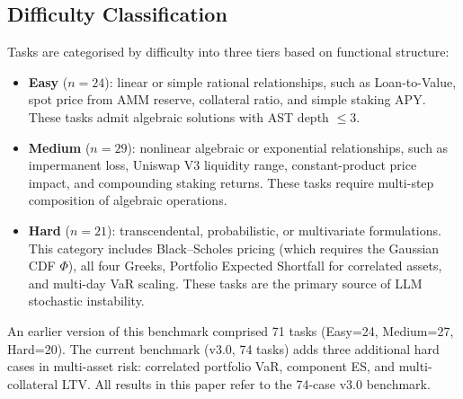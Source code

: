 
\subsection{Difficulty Classification}\label{subsec:difficulty-classification}
\label{sec:bench_difficulty}

Tasks are categorised by difficulty into three tiers based on functional structure:

\begin{itemize}
  \item \textbf{Easy} ($n=24$): linear or simple rational relationships, such as
    Loan-to-Value, spot price from AMM reserve, collateral ratio, and simple staking APY.
    These tasks admit algebraic solutions with AST depth $\le 3$.

  \item \textbf{Medium} ($n=29$): nonlinear algebraic or exponential relationships,
    such as impermanent loss, Uniswap V3 liquidity range, constant-product price impact,
    and compounding staking returns.  These tasks require multi-step composition
    of algebraic operations.

  \item \textbf{Hard} ($n=21$): transcendental, probabilistic, or multivariate
    formulations.  This category includes Black--Scholes pricing (which requires
    the Gaussian CDF $\Phi$), all four Greeks, Portfolio Expected Shortfall for
    correlated assets, and multi-day VaR scaling.  These tasks are the primary
    source of LLM stochastic instability.
\end{itemize}

\begin{remark}
An earlier version of this benchmark comprised 71 tasks (Easy=24, Medium=27,
Hard=20).  The current benchmark (v3.0, 74 tasks) adds three additional hard
cases in multi-asset risk: correlated portfolio VaR, component ES, and
multi-collateral LTV.  All results in this paper refer to the 74-case v3.0 benchmark.
\end{remark}
